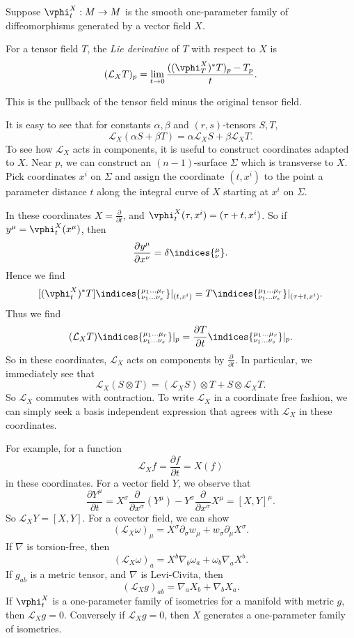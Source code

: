 \documentclass[12pt]{article}
\begin{document}
Suppose $\vphi_t^X : M \to M$ is the smooth one-parameter family of diffeomorphisms generated by a vector field $X$.

\begin{definition}
	For a tensor field $T$, the \emph{Lie derivative} of $T$ with respect to $X$ is
	\[
		(\mathcal{L}_X T)_p = \lim_{t \to 0} \frac{((\vphi_T^X)^{\ast} T)_p - T_p}{t}.
	\]
\end{definition}
This is the pullback of the tensor field minus the original tensor field.

It is easy to see that for constants $\alpha, \beta$ and $(r, s)$-tensors $S, T$,
\[
\mathcal{L}_X(\alpha S + \beta T) = \alpha \mathcal{L}_X S + \beta \mathcal{L}_X T.
\]
To see how $\mathcal{L}_X$ acts in components, it is useful to construct coordinates adapted to $X$. Near $p$, we can construct an $(n-1)$-surface $\Sigma$ which is transverse to $X$. Pick coordinates $x^i$ on $\Sigma$ and assign the coordinate $(t, x^i)$ to the point a parameter distance $t$ along the integral curve of $X$ starting at $x^i$ on $\Sigma$.

In these coordinates $X = \frac{\partial}{\partial t}$, and $\vphi_t^X(\tau, x^i) = (\tau + t, x^i)$. So if $y^{\mu} = \vphi_t^{X}(x^\mu)$, then
\[
\frac{\partial y^\mu}{\partial x^\nu} = \delta\indices{^{\mu}_{\nu}}.
\]
Hence we find
\[
	[(\vphi_t^X)^{\ast} T]\indices{^{\mu_1\ldots \mu_r}_{\nu_1 \ldots \nu_s}} |_{(t, x^i)} = T\indices{^{\mu_1 \ldots \mu_r}_{\nu_1 \ldots \nu_s}}|_{(\tau+ t, x^i)}.
\]
Thus we find
\[
	(\mathcal{L}_X T)\indices{^{\mu_1 \ldots \mu_r}_{\nu_1 \ldots \nu_s}}|_p = \frac{\partial T}{\partial t}\indices{^{\mu_1 \ldots \mu_r}_{\nu_1 \ldots \nu_s}}|_p.
\]
So in these coordinates, $\mathcal{L}_X$ acts on components by $\frac{\partial}{\partial t}$. In particular, we immediately see that
\[
\mathcal{L}_X(S \otimes T) = (\mathcal{L}_X S) \otimes T + S \otimes \mathcal{L}_X T.
\]
So $\mathcal{L}_X$ commutes with contraction. To write $\mathcal{L}_X$ in a coordinate free fashion, we can simply seek a basis independent expression that agrees with $\mathcal{L}_X$ in these coordinates.

For example, for a function
\[
\mathcal{L}_X f = \frac{\partial f}{\partial t} = X(f)
\]
in these coordinates. For a vector field $Y$, we observe that
\[
	\frac{\partial Y^\mu}{\partial t} =  X^\sigma \frac{\partial}{\partial x^\sigma} (Y^\mu) - Y^\sigma \frac{\partial}{\partial x^\sigma} X^\mu = [X, Y]^\mu.
\]
So $\mathcal{L}_X Y = [X, Y]$. For a covector field, we can show
\[
	(\mathcal{L}_X \omega)_\mu = X^\sigma \partial_\sigma w_\mu + w_\sigma \partial_\mu X^\sigma.
\]
If $\nabla$ is torsion-free, then
\[
	(\mathcal{L}_X \omega)_a = X^b \nabla_b \omega_a + \omega_b \nabla_a X^b.
\]
If $g_{ab}$ is a metric tensor, and $\nabla$ is Levi-Civita, then
\[
	(\mathcal{L}_X g)_{ab} = \nabla_a X_b + \nabla_b X_a.
\]
If $\vphi_t^X$ is a one-parameter family of isometries for a manifold with metric $g$, then $\mathcal{L}_X g = 0$. Conversely if $\mathcal{L}_X g = 0$, then $X$ generates a one-parameter family of isometries.
\end{document}
